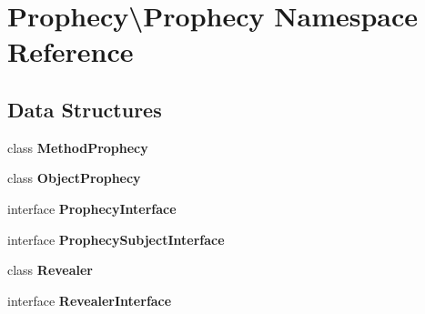 \section{Prophecy\textbackslash{}Prophecy Namespace Reference}
\label{namespace_prophecy_1_1_prophecy}
\subsection*{Data Structures}
\begin{DoxyCompactItemize}
\item 
class {\bf Method\+Prophecy}
\item 
class {\bf Object\+Prophecy}
\item 
interface {\bf Prophecy\+Interface}
\item 
interface {\bf Prophecy\+Subject\+Interface}
\item 
class {\bf Revealer}
\item 
interface {\bf Revealer\+Interface}
\end{DoxyCompactItemize}

